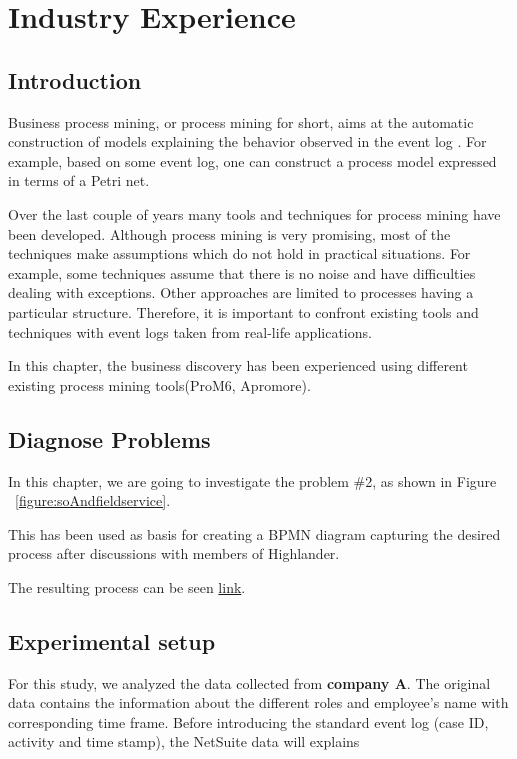 
\chapter{Industry Experience}
\label{chap:industryExperience}

\section{Introduction}
\label{sec:industryExperience-Introduction}

Business process mining, or process mining for short, aims at the automatic construction of models explaining the behavior observed in the event log \cite{maita2015process}. For example, based on some event log, one can construct a process model expressed in terms of a Petri net.

Over the last couple of years many tools and techniques for process mining have been developed\cite{rozinat2006decision}. Although process mining is very promising, most of the techniques make assumptions which do not hold in practical situations. For example, some techniques assume that there is no noise and have difficulties dealing with exceptions. Other approaches are limited to processes having a particular structure. Therefore, it is important to confront existing tools and techniques with event logs taken from real-life applications.

In this chapter, the business discovery has been experienced using different existing process mining tools(ProM6, Apromore).

\section{Diagnose Problems}

In this chapter, we are going to investigate the problem \#2, as shown in Figure ~\ref{figure:soAndfieldservice}.

This has been used as basis for creating a BPMN diagram capturing the desired process after discussions with members of Highlander.

The resulting process can be seen \href{https://raw.githubusercontent.com/kangqiwang/bpmResearch/main/transaction.png}{link}.


\section{Experimental setup}
\label{sec:industryExperience-Methodology}
For this study, we analyzed the data collected from  \textbf{company A}. 
The original data contains the information about the different roles and employee's name with corresponding time frame. Before introducing the  standard event log (case ID, activity and time stamp), the NetSuite data will explains


